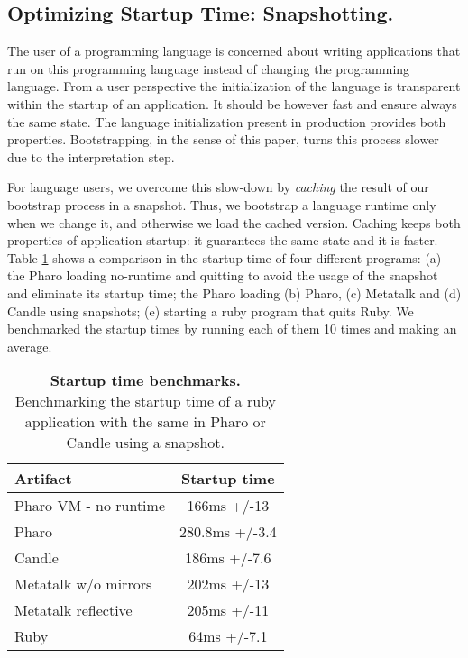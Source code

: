 \subsection*{Optimizing Startup Time: Snapshotting.}
The user of a programming language is concerned about writing applications that run on this programming language instead of changing the programming language. From a user perspective the initialization of the language is transparent within the startup of an application. It should be however fast and ensure always the same state.
The language initialization present in production \VMs provides both properties. Bootstrapping, in the sense of this paper, turns this process slower due to the interpretation step.

For language users, we overcome this slow-down by \emph{caching} the result of our bootstrap process in a snapshot. Thus, we bootstrap a language runtime only when we change it, and otherwise we load the cached version. Caching keeps both properties of application startup: it guarantees the same state and it is faster. Table \ref{tb:startup} shows a comparison in the startup time of four different programs: (a) the Pharo \VM loading no-runtime and quitting to avoid the usage of the snapshot and eliminate its startup time; the Pharo \VM loading (b) Pharo, (c) Metatalk and (d) Candle using snapshots; (e) starting a ruby program that quits Ruby. We benchmarked the startup times by running each of them 10 times and making an average.

\begin{table}[ht]
 	\centering
 	\begin{tabular}{lc}
			\toprule
			\textbf{Artifact}
 			& \textbf{Startup time}\\
		\toprule
		Pharo VM - no runtime &  166ms +/-13 \\\midrule
		Pharo & 280.8ms +/-3.4\\\midrule
		Candle & 186ms +/-7.6\\\midrule
		Metatalk w/o mirrors &202ms +/-13\\\midrule
		Metatalk reflective &205ms +/-11\\\bottomrule
		Ruby &  64ms +/-7.1\\\midrule
 	\end{tabular}
	\vspace*{0.2cm}
 	\caption{\small\textbf{Startup time benchmarks.} Benchmarking the startup time of a ruby application with the same in Pharo or Candle using a snapshot.\label{tb:startup}}
 \end{table}
 
